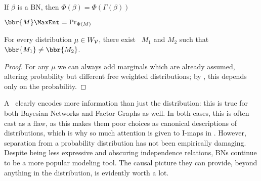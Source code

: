 
	\begin{prop}
		If $\beta$ is a BN, then $\Phi(\beta)  = \Phi(\Gamma(\beta))$
	\end{prop}


	\begin{conj}\label{thm:noninj}
		$\bbr{M}\MaxEnt = \Pr_{\Phi(M)}$
	\end{conj}
	\begin{coro}\label{coro:same-dist;different-weight}
		For every distribution $\mu \in W_{\cal V}$, there exist \MNs\ $M_1$ and $M_2$ such that $\bbr{M_1} \neq \bbr{M_2}$. 
	\end{coro}
	\begin{proof}
		For any $\mu$ we can always add marginals which are already assumed, altering probability but different free weighted distributions; by , this depends only on the probability.
	\end{proof}
	
	A \MN\ clearly encodes more information than just the distribution: this is true for both Bayesian Networks and Factor Graphs as well. In both cases, this is often cast as a flaw, as this makes them poor choices as canonical descriptions of distributions, which is why so much attention is given to I-maps in \parencite{koller2009probabilistic}. However, separation from a probability distribution has not been empirically damaging. Despite being less expressive and obscuring independence relations, BNs continue to be a more popular modeling tool. The causal picture they can provide, beyond anything in the distribution, is evidently worth a lot.

